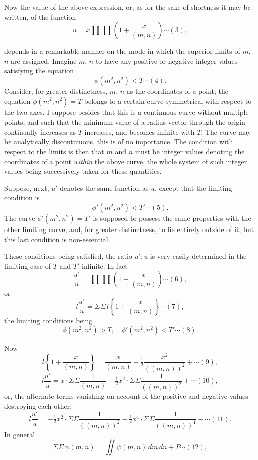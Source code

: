 \documentclass[12pt,a4paper]{article}
\newcommand{\mn}{(m,n)}
\begin{document}
Now the value of the above expression, or, as for the sake of shortness it may be written, of the function
\[
u = x\prod\prod\left(1 + \frac{x}{\mn}\right) \cdots(3),
\]

\newpage
\setcounter{page}{138}

depends in a remarkable manner on the mode in which the superior limits of $m$, $n$ are assigned. Imagine $m$, $n$ to have any positive or negative integer values satisfying the equation
\[
\phi(m^2, n^2) < T \cdots(4).
\]
Consider, for greater distinctness, $m$, $n$ as the coordinates of a point; the equation $\phi(m^2, n^2) = T$ belongs to a certain curve symmetrical with respect to the two axes. I suppose besides that this is a continuous curve without multiple points, and such that the minimum value of a radius vector through the origin continually increases as $T$ increases, and becomes infinite with $T$. The curve may be analytically discontinuous, this is of no importance. The condition with respect to the limits is then that $m$ and $n$ must be integer values denoting the coordinates of a point \textit{within} the above curve, the whole system of such integer values being successively taken for these quantities.

Suppose, next, $u'$ denotes the same function as $u$, except that the limiting condition is
\[
\phi'(m^2, n^2) < T' \cdots(5).
\]
The curve $\phi'(m^2, n^2) = T'$ is supposed to possess the same properties with the other limiting curve, and, for greater distinctness, to lie entirely outside of it; but this last condition is non-essential.

These conditions being satisfied, the ratio $u' : u$ is very easily determined in the limiting case of $T$ and $T'$ infinite. In fact
\[
\frac{u'}{u} = \prod\prod\left(1 + \frac{x}{\mn}\right) \cdots(6),
\]
or
\[
l\frac{u'}{u} = \Sigma\Sigma\, l\!\left\{1 + \frac{x}{\mn}\right\} \cdots(7),
\]
the limiting conditions being
\[
\phi(m^2, n^2) > T,\quad \phi'(m^2, n^2) < T' \cdots(8).
\]

Now
\[
l\!\left\{1 + \frac{x}{\mn}\right\} = \frac{x}{\mn} - \tfrac{1}{2}\frac{x^2}{(\mn)^2} + \cdots(9),
\]
\[
l\frac{u'}{u} = x\cdot\Sigma\Sigma\frac{1}{\mn} - \tfrac{1}{2}x^2\cdot\Sigma\Sigma\frac{1}{(\mn)^2} + \cdots(10),
\]
or, the alternate terms vanishing on account of the positive and negative values destroying each other,
\[
l\frac{u'}{u} = -\tfrac{1}{2}x^2\cdot\Sigma\Sigma\frac{1}{(\mn)^2} - \tfrac{1}{4}x^4\cdot\Sigma\Sigma\frac{1}{(\mn)^4} - \cdots(11).
\]
In general
\[
\Sigma\Sigma\,\psi(m, n) = \iint\psi(m, n)\,dm\,dn + P \cdots(12),
\]
\end{document}
